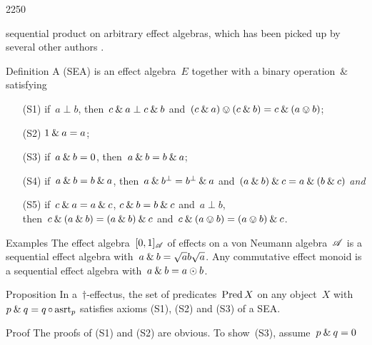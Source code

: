 \begin{parsec}{2250}
\begin{point}{10}
\begin{point}{30}
    sequential product on arbitrary effect algebras,
    which has been picked up by several other authors
    \cite{li2011sequential,gudder2005open,shen2009not,gudder2005uniqueness,jun2009remarks,weihua2009uniqueness,tkadlec2008atomic,jia2010entropy,arias2004almost}.
\end{point}
\end{point}
\begin{point}{40}{Definition}%
A  (SEA)
    is an effect algebra~$E$ together
    with a binary operation~$\&$
    satisfying
\begin{enumerate}
    \item[(S1)] if~$a \perp b$,
        then~$c \mathbin{\&} a \perp c \mathbin{\&} b$
        and~$(c \mathbin{\&} a) \ovee (c \mathbin{\&} b)
                = c \mathbin{\&} (a \ovee b)$;
    \item[(S2)] $1 \mathbin{\&} a =a$;
    \item[(S3)] if~$a \mathbin{\&} b = 0$,
            then~$a \mathbin{\&} b = b \mathbin{\&} a$;
    \item[(S4)]
        if~$a \mathbin{\&} b = b \mathbin{\&} a$,
        then~$a \mathbin{\&} b^\perp = b^\perp \mathbin{\&} a$
        and~$(a \mathbin{\&} b) \mathbin{\&} c
            = a \mathbin{\&} (b \mathbin{\&} c) $ \emph{and}
    \item[(S5)]
        if~$c \mathbin{\&} a = a \mathbin{\&} c$,
        $c \mathbin{\&} b = b \mathbin{\&} c$ and~$a \perp b$,\\
        then~$c \mathbin{\&} (a \mathbin{\&} b)
                = (a \mathbin{\&} b) \mathbin{\&} c$
                and~$c \mathbin{\&} (a \ovee b) = (a \ovee b) \mathbin{\&} c$.
\end{enumerate}
\end{point}
\begin{point}{50}{Examples}%
The effect algebra~$[0,1]_{\mathscr{A}}$
    of effects on a von Neumann algebra~$\mathscr{A}$
    is a sequential effect algebra with~$a \mathbin{\&} b = \sqrt{a}b\sqrt{a}$.
Any commutative effect monoid is a sequential effect algebra
    with~$a \mathbin{\&} b = a \odot b$.
\end{point}
\begin{point}{60}{Proposition}%
In a~$\dagger$-effectus,
    the set of predicates~$\operatorname{Pred} X$ on any object~$X$
    with~$p \mathbin{\&} q = q \mathop{\circ} \mathrm{asrt}_p$
    satisfies axioms (S1), (S2) and (S3) of a SEA.
\begin{point}{70}{Proof}%
The proofs of (S1) and (S2) are obvious.
To show~(S3), assume~$p \mathbin{\&} q = 0$

\end{point}
\end{point}
\end{parsec}
